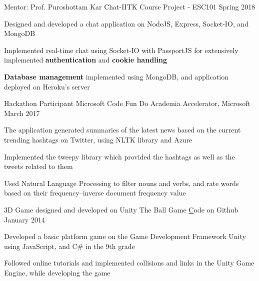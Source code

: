 
\begin{cventries}
  \cventry
    {Mentor: Prof. Puroshottam Kar}
    {Chat-IITK}
    {Course Project - ESC101}
    {Spring 2018}
    {
      \begin{cvitems}
        \item {Designed and developed a chat application on NodeJS, Express, Socket-IO, and MongoDB}
        \item {Implemented real-time chat using Socket-IO with PassportJS for extensively implemented \textbf{authentication} and \textbf{cookie handling}}
        \item {\textbf{Database management} implemented using MongoDB, and application deployed on Heroku's server}
      \end{cvitems}
    }

  \cventry
    {Hackathon Participant}
    {Microsoft Code Fun Do} 
    {Academia Accelerator, Microsoft}
    {March 2017}
    {
      \begin{cvitems} 
        \item {The application generated summaries of the latest news based on the current trending hashtags on Twitter, using NLTK library and Azure}
        \item {Implemented the tweepy library which provided the hashtags as well as the tweets related to them}
        \item {Used Natural Language Processing to filter nouns and verbs, and rate words based on their frequency–inverse document frequency value}
      \end{cvitems}
    }

  \cventry
    {3D Game designed and developed on Unity} 
    {The Ball Game} 
    {\href{https://github.com/7ayushgupta/UnityGame}Code on Github}
    {January 2014}
    {
      \begin{cvitems}
        \item {Developed a basic platform game on the Game Development Framework Unity using JavaScript, and C\# in the 9th grade}
        \item {Followed online tutorials and implemented collisions and links in the Unity Game Engine, while developing the game}
      \end{cvitems}
    }

\end{cventries}
